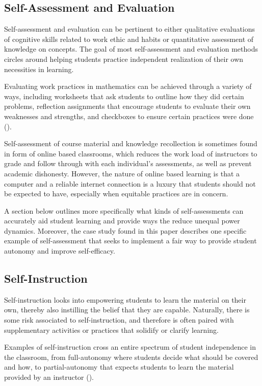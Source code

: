 \subsection{Self-Assessment and Evaluation}
Self-assessment and evaluation can be pertinent to either qualitative evaluations of cognitive skills related to work ethic and habits or quantitative assessment of knowledge on concepts.
The goal of most self-assessment and evaluation methods circles around helping students practice independent realization of their own necessities in learning.

Evaluating work practices in mathematics can be achieved through a variety of ways, including worksheets that ask students to outline how they did certain problems, reflection assignments that encourage students to evaluate their own weaknesses and strengths, and checkboxes to ensure certain practices were done (\cite{montague_self}).

Self-assessment of course material and knowledge recollection is sometimes found in form of online based classrooms, which reduces the work load of instructors to grade and follow through with each individual's assessments, as well as prevent academic dishonesty. However, the nature of online based learning is that a computer and a reliable internet connection is a luxury that students should not be expected to have, especially when equitable practices are in concern.

A section below outlines more specifically what kinds of self-assessments can accurately aid student learning and provide ways the reduce unequal power dynamics. Moreover, the case study found in this paper describes one specific example of self-assessment that seeks to implement a fair way to provide student autonomy and improve self-efficacy.

\subsection{Self-Instruction}
Self-instruction looks into empowering students to learn the material on their own, thereby also instilling the belief that they are capable. Naturally, there is some risk associated to self-instruction, and therefore is often paired with supplementary activities or practices that solidify or clarify learning.

Examples of self-instruction cross an entire spectrum of student independence in the classroom, from full-autonomy where students decide what should be covered and how, to partial-autonomy that expects students to learn the material provided by an instructor (\cite{burris_developmental_1972}).

